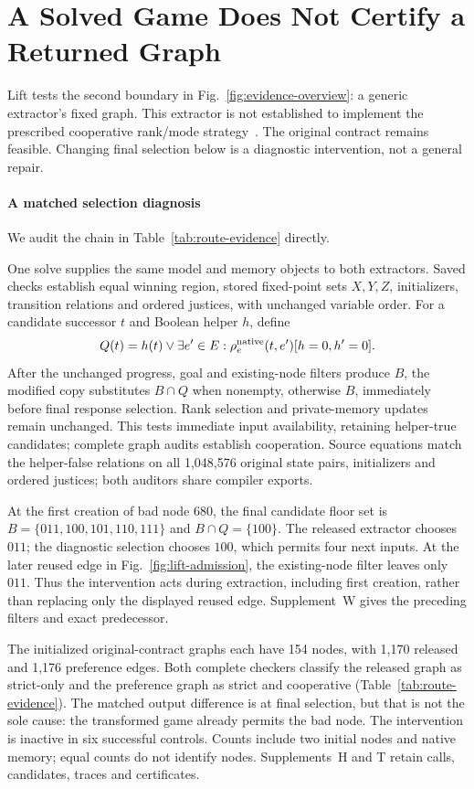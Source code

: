 \FloatBarrier
\section{A Solved Game Does Not Certify a Returned Graph}\label{sec:route}
Lift tests the second boundary in Fig.~\ref{fig:evidence-overview}:
a generic extractor's fixed graph. This extractor is not established to
implement the prescribed cooperative rank/mode strategy~\cite[Eq.~(18),
Theorem~3]{friendly}. The original contract remains feasible. Changing
final selection below is a diagnostic intervention, not a general repair.



\paragraph{A matched selection diagnosis}
We audit the chain in Table~\ref{tab:route-evidence} directly.

One solve supplies the same model and memory objects to both extractors.
Saved checks establish equal winning region, stored fixed-point sets
$X,Y,Z$, initializers,
transition relations and ordered justices, with unchanged variable order.
For a candidate successor $t$ and Boolean helper $h$, define
\[
 Q(t)=h(t)\lor\exists e'\in E:\rho_e^{\rm native}(t,e')[h=0,h'=0].
\]
After the unchanged progress, goal and existing-node filters produce
$B$, the modified copy substitutes $B\cap Q$ when nonempty, otherwise
$B$, immediately before final response selection. Rank selection and
private-memory updates remain unchanged. This tests immediate input
availability, retaining helper-true candidates; complete graph audits
establish cooperation. Source equations match the helper-false relations
on all 1,048,576 original state pairs, initializers and ordered justices;
both auditors share compiler exports.

At the first creation of bad node 680, the final candidate floor set is
$B=\{011,100,101,110,111\}$ and $B\cap Q=\{100\}$.
The released extractor chooses $011$; the diagnostic selection chooses
$100$, which permits four next inputs. At the later reused edge in
Fig.~\ref{fig:lift-admission}, the existing-node filter leaves only
$011$. Thus the intervention acts during extraction, including first
creation, rather than replacing only the displayed reused edge.
Supplement~W gives the preceding filters and exact predecessor.

The initialized original-contract graphs each have 154 nodes, with
1,170 released and 1,176 preference edges. Both complete checkers classify the released graph as strict-only and
the preference graph as strict and cooperative
(Table~\ref{tab:route-evidence}). The matched output difference is at final selection, but that is not
the sole cause: the transformed game already permits the bad node.
The intervention is inactive in six successful controls. Counts include
two initial nodes and native memory; equal counts do not identify nodes.
Supplements~H and T retain calls, candidates, traces and certificates.

